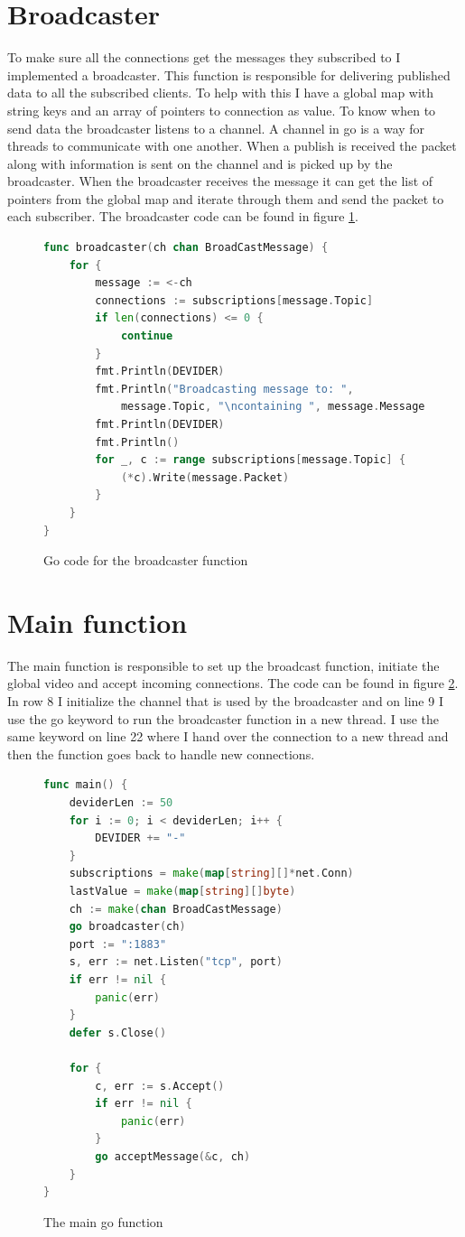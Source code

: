 \documentclass{article}
\begin{document}
\section{Broadcaster}
To make sure all the connections get the messages they subscribed to I implemented a broadcaster. This function is responsible for delivering published data to all the subscribed clients. To help with this I have a global map with string keys and an array of pointers to connection as value. To know when to send data the broadcaster listens to a channel. A channel in go is a way for threads to communicate with one another. When a publish is received the packet along with information is sent on the channel and is picked up by the broadcaster. When the broadcaster receives the message it can get the list of pointers from the global map and iterate through them and send the packet to each subscriber. The broadcaster code can be found in figure \ref{fig:broadFunc}. 
\begin{figure}[H]
    \begin{lstlisting}[language=go]
func broadcaster(ch chan BroadCastMessage) {
	for {
		message := <-ch
		connections := subscriptions[message.Topic]
		if len(connections) <= 0 {
			continue
		}
		fmt.Println(DEVIDER)
		fmt.Println("Broadcasting message to: ",
			message.Topic, "\ncontaining ", message.Message)
		fmt.Println(DEVIDER)
		fmt.Println()
		for _, c := range subscriptions[message.Topic] {
			(*c).Write(message.Packet)
		}
	}
}
    \end{lstlisting}
    \label{fig:broadFunc}
    \caption{Go code for the broadcaster function}
\end{figure}

\newpage
\section{Main function}
The main function is responsible to set up the broadcast function, initiate the global video and accept incoming connections. The code can be found in figure \ref{fig:mainGO}. In row 8 I initialize the channel that is used by the broadcaster and on line 9 I use the go keyword to run the broadcaster function in a new thread. I use the same keyword on line 22 where I hand over the connection to a new thread and then the function goes back to handle new connections.
\begin{figure}[H]
    \begin{lstlisting}[language=go]
func main() {
	deviderLen := 50
	for i := 0; i < deviderLen; i++ {
		DEVIDER += "-"
	}
	subscriptions = make(map[string][]*net.Conn)
	lastValue = make(map[string][]byte)
	ch := make(chan BroadCastMessage)
	go broadcaster(ch)
	port := ":1883"
	s, err := net.Listen("tcp", port)
	if err != nil {
		panic(err)
	}
	defer s.Close()

	for {
		c, err := s.Accept()
		if err != nil {
			panic(err)
		}
		go acceptMessage(&c, ch)
	}
}
    \end{lstlisting}
    \caption{The main go function}
    \label{fig:mainGO}
\end{figure}
\end{document}
